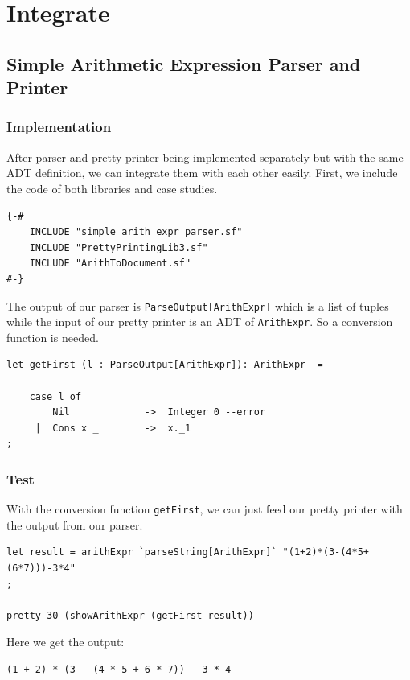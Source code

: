 \section{Integrate}

\subsection{Simple Arithmetic Expression Parser and Printer}

\subsubsection{Implementation}

After parser and pretty printer being implemented separately but with the same ADT definition, we can integrate them with each other easily. First, we include the code of both libraries and case studies.

\begin{lstlisting}
{-#
    INCLUDE "simple_arith_expr_parser.sf"
    INCLUDE "PrettyPrintingLib3.sf"
    INCLUDE "ArithToDocument.sf"
#-}
\end{lstlisting}

The output of our parser is \texttt{ParseOutput[ArithExpr]} which is a list of tuples while the input of our pretty printer is an ADT of \texttt{ArithExpr}. So a conversion function is needed.

\begin{lstlisting}
let getFirst (l : ParseOutput[ArithExpr]): ArithExpr  =

    case l of
        Nil             ->  Integer 0 --error
     |  Cons x _        ->  x._1
;
\end{lstlisting}

\subsubsection{Test}
With the conversion function \texttt{getFirst}, we can just feed our pretty printer with the output from our parser.
\begin{lstlisting}
let result = arithExpr `parseString[ArithExpr]` "(1+2)*(3-(4*5+(6*7)))-3*4"
;

pretty 30 (showArithExpr (getFirst result))
\end{lstlisting}

Here we get the output:
\begin{lstlisting}
(1 + 2) * (3 - (4 * 5 + 6 * 7)) - 3 * 4
\end{lstlisting}


